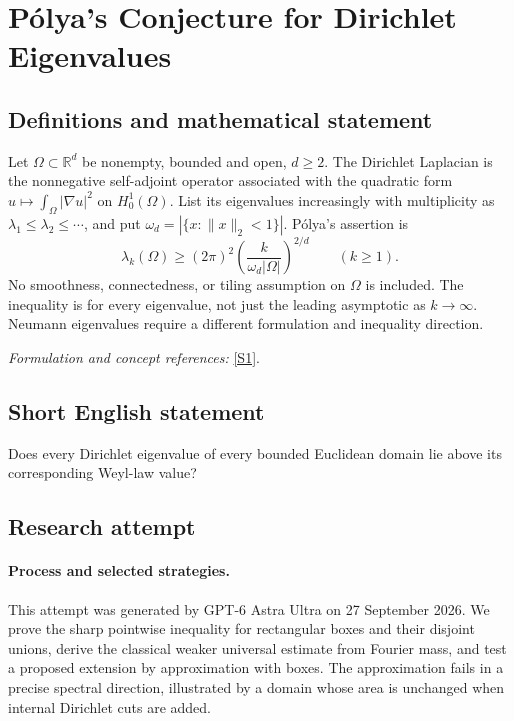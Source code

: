 \documentclass[11pt]{article}
\begin{document}
\section*{\texorpdfstring{Pólya's Conjecture for Dirichlet Eigenvalues}{Pólya's Conjecture for Dirichlet Eigenvalues}}\label{statement}
\subsection{Definitions and mathematical statement}
Let $\Omega\subset{\mathbb{R}}^d$ be nonempty, bounded and open, $d\ge2$. The Dirichlet Laplacian is the nonnegative self-adjoint operator associated with the quadratic form $u\mapsto\int_\Omega|\nabla u|^2$ on $H_0^1(\Omega)$. List its eigenvalues increasingly with multiplicity as $\lambda_1\le\lambda_2\le\cdots$, and put $\omega_d=|\{x:\|x\|_2<1\}|$. P\'olya's assertion is
\[
 \lambda_k(\Omega)\ge(2\pi)^2
 \left(\frac{k}{\omega_d|\Omega|}\right)^{2/d}
 \qquad(k\ge1).
\]
No smoothness, connectedness, or tiling assumption on $\Omega$ is included. The inequality is for every eigenvalue, not just the leading asymptotic as $k\to\infty$. Neumann eigenvalues require a different formulation and inequality direction.
\par\smallskip\textit{Formulation and concept references:} \href{https://link.springer.com/article/10.1007/s00222-023-01198-1}{[S1]}.

\subsection{Short English statement}
Does every Dirichlet eigenvalue of every bounded Euclidean domain lie above its corresponding Weyl-law value?
\subsection{Research attempt}
\paragraph{Process and selected strategies.}
This attempt was generated by GPT-6 Astra Ultra on 27 September 2026. We prove the sharp pointwise inequality for rectangular boxes and their disjoint unions, derive the classical weaker universal estimate from Fourier mass, and test a proposed extension by approximation with boxes. The approximation fails in a precise spectral direction, illustrated by a domain whose area is unchanged when internal Dirichlet cuts are added.
\end{document}
